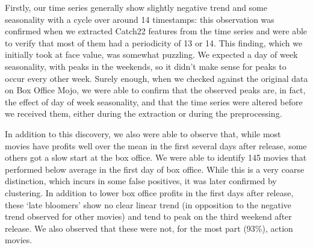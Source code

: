 Firstly, our time series generally show slightly negative trend and some seasonality with a cycle over around 14 timestamps: this observation was confirmed when we extracted Catch22 features from the time series and were able to verify that most of them had a periodicity of 13 or 14.
This finding, which we initially took at face value, was somewhat puzzling.  We expected a day of week seasonality, with peaks in the weekends, so it didn't make sense for peaks to occur every other week.
Surely enough, when we checked against the original data on Box Office Mojo, we were able to confirm that the observed peaks are, in fact, the effect of day of week seasonality, and that the time series were altered before we received them, either during the extraction or during the preprocessing.

In addition to this discovery, we also were able to observe that, while most movies have profits well over the mean in the first several days after release, some others got a slow start at the box office.
We were able to identify 145 movies that performed below average in the first day of box office. While this is a very coarse distinction, which incurs in some false positives, it was later confirmed by clustering.
In addition to lower box office profits in the first days after release, these `late bloomers' show no clear linear trend (in opposition to the negative trend observed for other movies) and tend to peak on the third weekend after release. We also observed that these were not, for the most part (93\%), action movies.